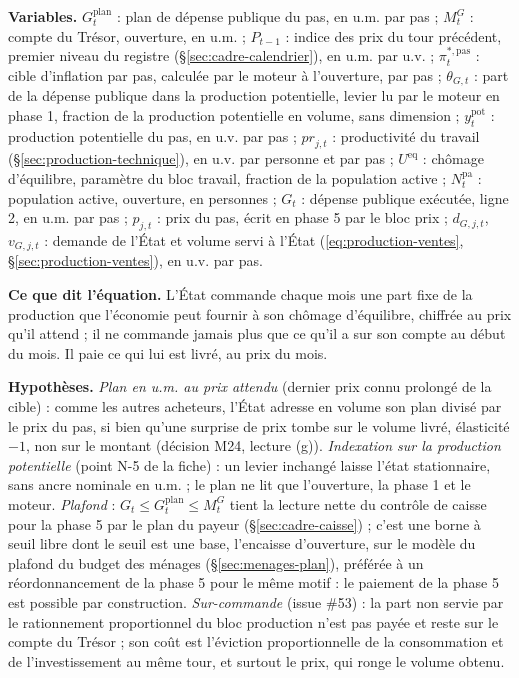 \documentclass[11pt,a4paper]{article}
\newcommand{\variables}{\par\noindent\textbf{Variables.} }
\newcommand{\sens}{\par\noindent\textbf{Ce que dit l'équation.} }
\newcommand{\hyp}{\par\noindent\textbf{Hypothèses.} }
\begin{document}
\begin{proposee}
\variables $G^{\mathrm{plan}}_t$ : plan de dépense publique du pas, en u.m. par pas ; $M^G_t$ : compte du Trésor, ouverture, en u.m. ; $P_{t-1}$ : indice des prix du tour précédent, premier niveau du registre (\S\ref{sec:cadre-calendrier}), en u.m. par u.v. ; $\pi^{\ast,\mathrm{pas}}_t$ : cible d'inflation par pas, calculée par le moteur à l'ouverture, par pas ; $\theta_{G,t}$ : part de la dépense publique dans la production potentielle, levier lu par le moteur en phase 1, fraction de la production potentielle en volume, sans dimension ; $y^{\mathrm{pot}}_t$ : production potentielle du pas, en u.v. par pas ; $\mathit{pr}_{j,t}$ : productivité du travail (\S\ref{sec:production-technique}), en u.v. par personne et par pas ; $U^{\mathrm{eq}}$ : chômage d'équilibre, paramètre du bloc travail, fraction de la population active ; $N^{\mathrm{pa}}_t$ : population active, ouverture, en personnes ; $G_t$ : dépense publique exécutée, ligne 2, en u.m. par pas ; $p_{j,t}$ : prix du pas, écrit en phase 5 par le bloc prix ; $d_{G,j,t}$, $v_{G,j,t}$ : demande de l'État et volume servi à l'État (\eqref{eq:production-ventes}, \S\ref{sec:production-ventes}), en u.v. par pas.
\sens L'État commande chaque mois une part fixe de la production que l'économie peut fournir à son chômage d'équilibre, chiffrée au prix qu'il attend ; il ne commande jamais plus que ce qu'il a sur son compte au début du mois. Il paie ce qui lui est livré, au prix du mois.
\hyp \emph{Plan en u.m. au prix attendu} (dernier prix connu prolongé de la cible) : comme les autres acheteurs, l'État adresse en volume son plan divisé par le prix du pas, si bien qu'une surprise de prix tombe sur le volume livré, élasticité $-1$, non sur le montant (décision M24, lecture (g)). \emph{Indexation sur la production potentielle} (point N-5 de la fiche) : un levier inchangé laisse l'état stationnaire, sans ancre nominale en u.m. ; le plan ne lit que l'ouverture, la phase 1 et le moteur. \emph{Plafond} : $G_t \le G^{\mathrm{plan}}_t \le M^G_t$ tient la lecture nette du contrôle de caisse pour la phase 5 par le plan du payeur (\S\ref{sec:cadre-caisse}) ; c'est une borne à seuil libre dont le seuil est une base, l'encaisse d'ouverture, sur le modèle du plafond du budget des ménages (\S\ref{sec:menages-plan}), préférée à un réordonnancement de la phase 5 pour le même motif : le paiement de la phase 5 est possible par construction. \emph{Sur-commande} (issue \#53) : la part non servie par le rationnement proportionnel du bloc production n'est pas payée et reste sur le compte du Trésor ; son coût est l'éviction proportionnelle de la consommation et de l'investissement au même tour, et surtout le prix, qui ronge le volume obtenu.

\end{proposee}
\end{document}
